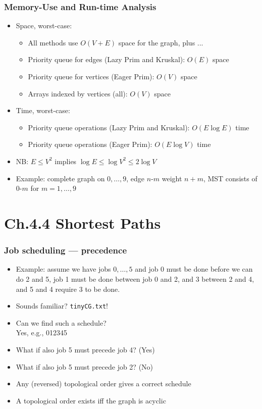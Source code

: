 \documentclass[handout]{beamer}
\begin{document}
\begin{frame}
    \frametitle{Memory-Use and Run-time Analysis}
\begin{itemize}[<+->] \item Space, worst-case:
\begin{itemize}[<+->]
\item All methods use $O(V+E)$ space for the graph, plus ...
\item Priority queue for edges (Lazy Prim and Kruskal): $O(E)$ space
\item Priority queue for vertices (Eager Prim): $O(V)$ space
\item Arrays indexed by vertices (all): $O(V)$ space
\end{itemize} 
\item Time, worst-case:
\begin{itemize}[<+->]
\item Priority queue operations (Lazy Prim and Kruskal): $O(E\log E)$ time
\item Priority queue operations (Eager Prim): $O(E\log V)$ time
\end{itemize}
\item NB: $E\leq V^2$ implies $\log E \leq \log V^2 \leq 2\log V$
\item Example: complete graph on $0,\ldots,9$, edge $n$-$m$ weight $n{+}m$,
MST consists of $0$-$m$ for $m=1,\ldots,9$
\end{itemize} 
\end{frame}

\section{Ch.4.4 Shortest Paths}

\begin{frame}
    \frametitle{Job scheduling --- precedence}\label{Job_prec}

\begin{itemize}[<+->]
\item Example: assume we have jobs $0,\ldots,5$ and job 0 must be done before we can
do 2 and 5, job 1 must be done between job 0 and 2, and 3 between 2 and 4,
and 5 and 4 require 3 to be done.
\item Sounds familiar? {\tt tinyCG.txt}!
\item Can we find such a schedule?\\Yes, e.g., 012345
\item What if also job 5 must precede job 4? (Yes)
\item What if also job 5 must precede job 2? (No)
\item Any (reversed) topological order gives a correct schedule
\item A topological order exists iff the graph is acyclic
\end{itemize} 
\end{frame}
\end{document}
